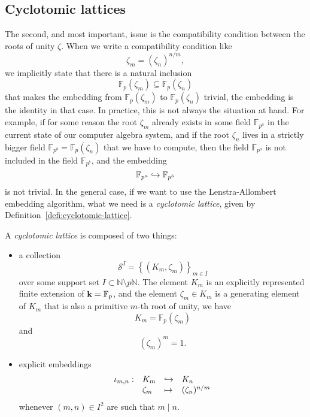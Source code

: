 \subsection{Cyclotomic lattices}

The second, and most important, issue is the compatibility condition between the
roots of unity $\zeta$. When we write a compatibility condition like
\[
  \zeta_m = (\zeta_n)^{n/m},
\]
we implicitly state that there is a natural inclusion 
\[
  \mathbb{F}_p(\zeta_m)\subseteq\mathbb{F}_p(\zeta_n)
\]
that makes the embedding from $\mathbb{F}_{p}(\zeta_m)$ to
$\mathbb{F}_{p}(\zeta_n)$ trivial, \ie the embedding is the identity in that
case. In practice, this is not always the situation at hand. For example,
if for some reason the root $\zeta_m$ already exists in some field
$\mathbb{F}_{p^a}$ in the current state of our computer algebra system, and if the
root $\zeta_n$ lives in a strictly bigger field
$\mathbb{F}_{p^b}=\mathbb{F}_p(\zeta_n)$ that we have to compute, then the field
$\mathbb{F}_{p^a}$ is not included in the field $\mathbb{F}_{p^b}$, and the
embedding
\[
  \mathbb{F}_{p^a}\hookrightarrow \mathbb{F}_{p^b}
\]
is not trivial. In the general case, if we want to use the Lenstra-Allombert
embedding algorithm, what we need is a \emph{cyclotomic
lattice}, given by Definition~\ref{defi:cyclotomic-lattice}.
\begin{defi}
  \label{defi:cyclotomic-lattice}
  A \emph{cyclotomic lattice} is composed of two things:
  \begin{itemize}
    \item a collection
  \[
    \mathcal S^I = \left\{ (K_m, \zeta_m) \right\}_{m\in I}
  \]
  over some support set $I\subset \mathbb{N}\setminus p\mathbb{N}$. The element
  $K_m$ is an explicitly represented finite extension of $\mathbf{k}=\mathbb{F}_p$, and
  the element $\zeta_m\in K_m$ is a generating element of $K_m$ that is also a
  primitive $m$-th root of unity, \ie we have
  \[
  K_m = \mathbb{F}_{p}(\zeta_m)
  \]
  and
  \[
  (\zeta_m)^m=1.
  \]
    \item explicit embeddings
      \[
        \begin{array}{llll}
          \iota_{m, n}: & K_m & \hookrightarrow & K_n\\
          & \zeta_m & \mapsto & (\zeta_n)^{n/m}
        \end{array}
      \]
      whenever $(m, n)\in I^2$ are such that $m\mid n$.
  \end{itemize}
\end{defi}

